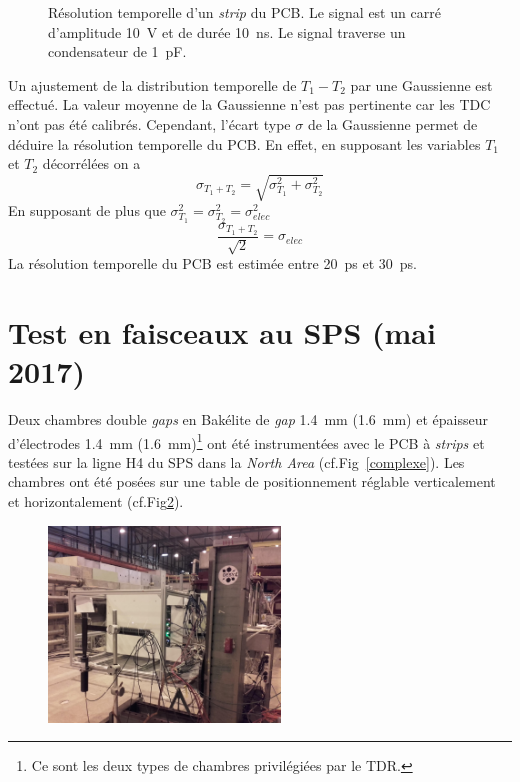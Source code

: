 \begin{figure}[!ht]
	\centering
	\caption{Résolution temporelle d'un \textit{strip} du PCB. Le signal est un carré d'amplitude \SI{10}{\volt} et de durée \SI{10}{\nano\second}. Le signal traverse un condensateur de \SI{1}{\pico\farad}.}
	\label{RESOLUTION}
\end{figure}

Un ajustement de la distribution temporelle de $T_{1}-T_{2}$ par une Gaussienne est effectué. La valeur moyenne de la Gaussienne n'est pas pertinente car les TDC n'ont pas été calibrés. Cependant, l'écart type $\sigma$ de la Gaussienne permet de déduire la résolution temporelle du PCB. En effet, en supposant les variables $T_1$ et $T_2$ décorrélées on a
\begin{equation}
\sigma_{T_1+T_2}=\sqrt{\sigma_{T_1}^2+\sigma_{T_2}^2}
\end{equation}
En supposant de plus que $\sigma_{T_1}^2=\sigma_{T_2}^2=\sigma_{elec}^2$
\begin{equation}
\frac{\sigma_{T_1+T_2}}{\sqrt{2}}=\sigma_{elec}
\end{equation}
La résolution temporelle du PCB est estimée entre \SI{20}{\pico\second} et \SI{30}{\pico\second}.

\section{Test en faisceaux au SPS (mai 2017)}
\vspace{-0.4cm}
Deux chambres double \textit{gaps} en Bakélite de \textit{gap} \SI{1.4}{\milli\meter} (\SI{1.6}{\milli\meter}) et épaisseur d'électrodes \SI{1.4}{\milli\meter} (\SI{1.6}{\milli\meter})\footnote{Ce sont les deux types de chambres privilégiées par le TDR.} ont été instrumentées avec le PCB à \textit{strips} et testées sur la ligne H4 du SPS dans la \textit{North Area} (cf.Fig~\ref{complexe}). Les chambres ont été posées sur une table de positionnement réglable verticalement et horizontalement (cf.Fig\ref{setup2017}).
\begin{figure}[ht!]
	\centering
	\includegraphics[width=0.55\textwidth]{ELE/setup2017.jpg}
	\label{setup2017}
\end{figure}

